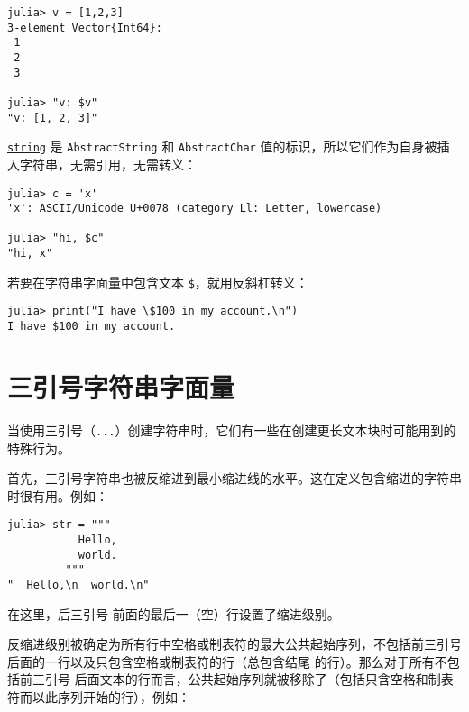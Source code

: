 \begin{verbatim}
julia> v = [1,2,3]
3-element Vector{Int64}:
 1
 2
 3

julia> "v: $v"
"v: [1, 2, 3]"
\end{verbatim}



\hyperlink{7919678712989769360}{\texttt{string}} 是 \texttt{AbstractString} 和 \texttt{AbstractChar} 值的标识，所以它们作为自身被插入字符串，无需引用，无需转义：




\begin{verbatim}
julia> c = 'x'
'x': ASCII/Unicode U+0078 (category Ll: Letter, lowercase)

julia> "hi, $c"
"hi, x"
\end{verbatim}



若要在字符串字面量中包含文本 \texttt{\$}，就用反斜杠转义：




\begin{verbatim}
julia> print("I have \$100 in my account.\n")
I have $100 in my account.
\end{verbatim}



\hypertarget{6215712550513853493}{}


\section{三引号字符串字面量}



当使用三引号（\texttt{{\textquotedbl}{\textquotedbl}{\textquotedbl}...{\textquotedbl}{\textquotedbl}{\textquotedbl}}）创建字符串时，它们有一些在创建更长文本块时可能用到的特殊行为。



首先，三引号字符串也被反缩进到最小缩进线的水平。这在定义包含缩进的字符串时很有用。例如：




\begin{verbatim}
julia> str = """
           Hello,
           world.
         """
"  Hello,\n  world.\n"
\end{verbatim}



在这里，后三引号 \texttt{{\textquotedbl}{\textquotedbl}{\textquotedbl}} 前面的最后一（空）行设置了缩进级别。



反缩进级别被确定为所有行中空格或制表符的最大公共起始序列，不包括前三引号 \texttt{{\textquotedbl}{\textquotedbl}{\textquotedbl}} 后面的一行以及只包含空格或制表符的行（总包含结尾 \texttt{{\textquotedbl}{\textquotedbl}{\textquotedbl}} 的行）。那么对于所有不包括前三引号 \texttt{{\textquotedbl}{\textquotedbl}{\textquotedbl}} 后面文本的行而言，公共起始序列就被移除了（包括只含空格和制表符而以此序列开始的行），例如：




